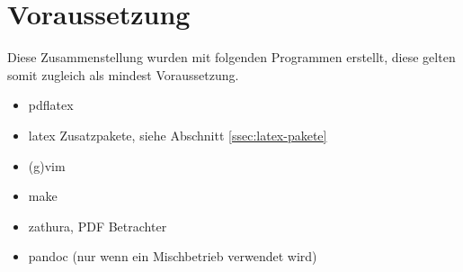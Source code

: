 \section{Voraussetzung}
\label{sec:voraussetzung}

Diese Zusammenstellung wurden mit folgenden Programmen erstellt,
diese gelten somit zugleich als mindest Voraussetzung.

\begin{itemize}
	\item pdflatex
	\item latex Zusatzpakete, siehe Abschnitt \vref{ssec:latex-pakete}
	\item (g)vim
	\item make
	\item zathura, PDF Betrachter
	\item pandoc (nur wenn ein Mischbetrieb verwendet wird)
\end{itemize}

